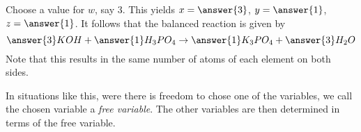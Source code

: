 \documentclass{ximera}
\begin{document}
\begin{example}
\begin{solution}
  Choose a value for $w$, say $3$. This yields $x=\answer{3}$, $y=\answer{1}$, $z=\answer{1}$. It follows that the balanced reaction is given by
  \begin{equation*}
    \answer{3}KOH+\answer{1}H_3PO_4\rightarrow \answer{1}K_3PO_4+\answer{3}H_2O
  \end{equation*}
  Note that this results in the same number of atoms of each element
  on both sides.


\end{solution}

\end{example}

\begin{remark}

  In situations like this, were there is freedom to chose one of the variables, we call the chosen variable a \emph{free variable}. The other variables are then determined in terms of the free variable.

\end{remark}
\end{document}
